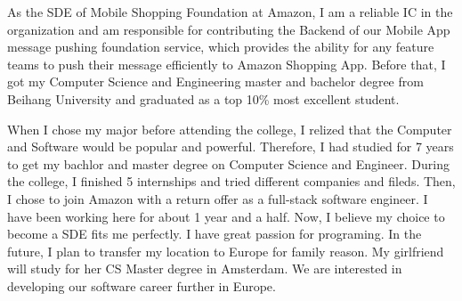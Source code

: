 


As the SDE of Mobile Shopping Foundation at Amazon, I am a reliable IC in the organization and am responsible for contributing the Backend of our Mobile App message pushing foundation service, which provides the ability for any feature teams to push their message efficiently to Amazon Shopping App. Before that, I got my Computer Science and Engineering master and bachelor degree from Beihang University and graduated as a top 10\% most excellent student.

When I chose my major before attending the college, I relized that the Computer and Software would be popular and powerful.
Therefore, I had studied for 7 years to get my bachlor and master degree on Computer Science and Engineer. During the college, I finished 5 internships and tried different companies and fileds. Then, I chose to join Amazon with a return offer as a full-stack software engineer. I have been working here for about 1 year and a half. Now, I believe my choice to become a SDE fits me perfectly. I have great passion for programing.
In the future, I plan to transfer my location to Europe for family reason. My girlfriend will study for her CS Master degree in Amsterdam. We are interested in developing our software career further in Europe.